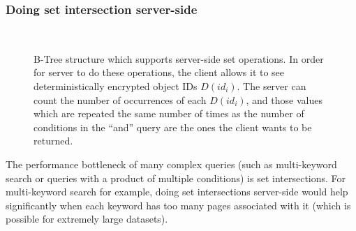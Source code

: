\documentclass[notitlepage]{revtex4-1}
\begin{document}
\subsubsection{Doing set intersection server-side}
\label{sec:server-intersection}

\begin{figure}
	\begin{center}
        \qquad
        \\
	\end{center}
    \caption{B-Tree structure which supports server-side set operations.
        In order for server to do these operations, the client allows it to see deterministically encrypted object IDs $D(id_i)$.
        The server can count the number of occurrences of each $D(id_i)$, and those values which are repeated the same number of times as the number of conditions in the ``and'' query are the ones the client wants to be returned.
    }
	\label{fig:server-side-sets}
\end{figure}

The performance bottleneck of many complex queries (such as multi-keyword search or queries with a product of multiple conditions) is set intersections.
For multi-keyword search for example, doing set intersections server-side would help significantly when each keyword has too many pages associated with it (which is possible for extremely large datasets).
\end{document}
